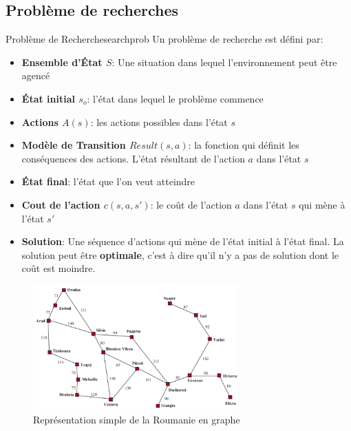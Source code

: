 \subsection{Problème de recherches} %
\label{sub:probleme_de_recherches}

\begin{definition}{Problème de Recherche}{searchprob}
    Un problème de recherche est défini par:
    \begin{itemize}
        \item \textbf{Ensemble d'État $S$}: Une situation dans lequel l'environnement peut être agencé
        \item \textbf{État initial $s_o$}: l'état dans lequel le problème commence
        \item \textbf{Actions $A(s)$}: les actions possibles dans l'état $s$
        \item \textbf{Modèle de Transition $Result(s, a)$}: la fonction qui définit les conséquences des actions. L'état résultant de l'action $a$ dans l'état $s$
        \item \textbf{État final}: l'état que l'on veut atteindre
        \item \textbf{Cout de l'action $c(s, a, s')$}: le coût de l'action $a$ dans l'état $s$ qui mène à l'état $s'$
        \item \textbf{Solution}: Une séquence d'actions qui mène de l'état initial à l'état final. La solution 
            peut être \textbf{optimale}, c'est à dire qu'il n'y a pas de solution dont le coût est moindre.
    \end{itemize}
\end{definition}


\begin{figure}[H]
    \begin{center}
        \includegraphics[width=0.70\textwidth]{./pictures/roumanie.png}
    \end{center}
    \caption{Représentation simple de la Roumanie en graphe}\label{fig:romania}
\end{figure}



